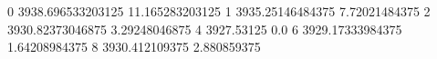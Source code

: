 0 3938.696533203125 11.165283203125
1 3935.25146484375 7.72021484375
2 3930.82373046875 3.29248046875
4 3927.53125 0.0
6 3929.17333984375 1.64208984375
8 3930.412109375 2.880859375
